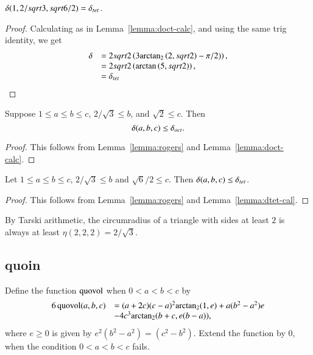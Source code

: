 \begin{lemma}
  $\delta(1,2/sqrt3,sqrt6/2)=\delta_{tet}$.
\end{lemma}

\begin{proof} Calculating as in Lemma~\ref{lemma:doct-calc}, and using
the same trig identity, we get
$$\begin{array}{lll}
  \delta &=
2sqrt{2} \left(3{\operatorname{arctan_2}}\left(2,sqrt2\right) - \pi/2)\right),\\
  &=2sqrt{2}\left(\arctan\left(5,sqrt2\right)\right),\\
  &=\delta_{tet}
\end{array}
$$
\end{proof}

\begin{lemma}
Suppose $1\le a\le  b\le c$,  $2/\sqrt{3}\le b$, and $\sqrt2\le c$.  Then
$$
\delta(a,b,c) \le \delta_{oct}.
$$
\end{lemma}

\begin{proof} This follows from Lemma~\ref{lemma:rogers} and
Lemma~\ref{lemma:doct-calc}.
\end{proof}

\begin{lemma}
Let $1\le a \le b \le c$, $2/\sqrt{3}\le b$ and $\sqrt6/2\le c$.
Then $\delta(a,b,c) \le  \delta_{tet}$.
\end{lemma}

\begin{proof}  This follows from Lemma~\ref{lemma:rogers} and
Lemma~\ref{lemma:dtet-cal}.
\end{proof}

By Tarski arithmetic, the circumradius of a triangle
with sides at least $2$ is always at least $\eta(2,2,2)=2/\sqrt3$.



\subsection{quoin}

Define the function ${\operatorname{quovol}}$ when $0<a<b<c$ by
    \begin{equation}
    \begin{array}{lll}
    6\,\op{quovol}(a,b,c) &= (a+2c)  %
    (c-a)^2\atn(1,e)
        +a(b^2-a^2)e\\&-4c^3\atn(b+c,e(b-a)),
    \tlabel{eqn:3.3}
    \end{array}
    \end{equation}
where $e\ge0$ is given by $e^2(b^2-a^2)=(c^2-b^2)$.
Extend the function by $0$, when the condition $0<a<b<c$ fails.



